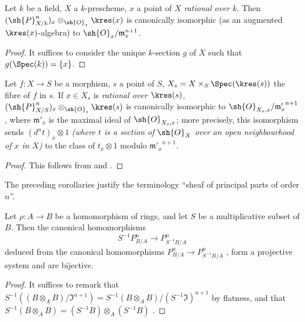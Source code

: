 \begin{corollary}[16.4.12]
\label{IV.16.4.12}
Let $k$ be a field, $X$ a $k$-prescheme, $x$ a point of $X$ \emph{rational over $k$}.
Then $(\sh{P}_{X/k}^n)_x \otimes_{\sh{O}_x} \kres(x)$ is canonically isomorphic (as an augmented $\kres(x)$-algebra) to $\sh{O}_x/\mathfrak{m}_x^{n+1}$.
\end{corollary}

\begin{proof}
It suffices to consider the unique $k$-section $g$ of $X$ such that $g(\Spec(k)) = \{x\}$.
\end{proof}

\begin{corollary}[16.4.13]
\label{IV.16.4.13}
Let $f: X \to S$ be a morphism, $s$ a point of $S$, $X_s = X \times_S \Spec(\kres(s))$ the fibre of $f$ in $s$.
If $x \in X_s$ is \emph{rational over $\kres(s)$}, $(\sh{P}_{X/S}^n)_x \otimes_{\sh{O}_s} \kres(s)$ is canonically isomorphic to $\sh{O}_{X_s, x}/{\mathfrak{m}'_x}^{n+1}$, where $\mathfrak{m}'_x$ is the maximal ideal of $\sh{O}_{X_s, x}$;
more precisely, this isomorphism sends $(d^n t)_x \otimes 1$ \emph{(where $t$ is a section of $\sh{O}_X$ over an open neighbourhood of $x$ in $X$)} to the class of $t_x \otimes 1$ modulo ${\mathfrak{m}'_x}^{n+1}$.
\end{corollary}

\begin{proof}
This follows from  and .
\end{proof}

The preceding corollaries justify the terminology ``sheaf of principal parts of order $n$''.

\begin{proposition}[16.4.14]
\label{IV.16.4.14}
Let $\rho:A \to B$ be a homomorphism of rings, and let $S$ be a multiplicative subset of $B$.
Then the canonical homomorphisms 
\[
  \label{IV.16.4.14.1}
  S^{-1}P_{B/A}^n \to P_{S^{-1}B/A}^n
  \tag{16.4.14.1}
\] 
deduced from the canonical homomorphisms $P_{B/A}^n \to P_{S^{-1}B/A}^n$ , form a projective system and are bijective.
\end{proposition}

\begin{proof}
It suffices to remark that $S^{-1}((B \otimes_A B)/\mathfrak{I}^{n+1}) = S^{-1}(B \otimes_A B)/(S^{-1}\mathfrak{I})^{n+1}$ by flatness, and that $S^{-1}(B \otimes_A B) = (S^{-1}B)\otimes_A (S^{-1}B) $ .
\end{proof}

